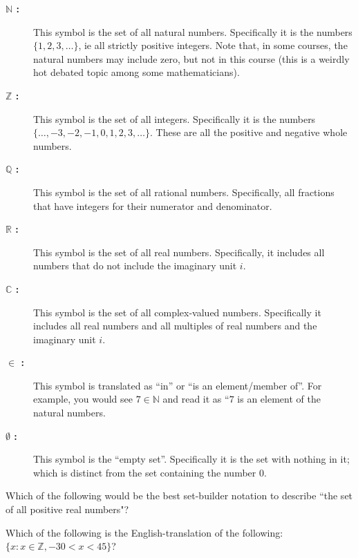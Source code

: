 \documentclass{ximera}
\begin{document}
    \begin{description}
        \item[\textbf{$\mathbb{N}$ :}] This symbol is the set of all natural numbers. Specifically it is the numbers $\{1, 2, 3, \dots \}$, ie all strictly positive integers. Note that, in some courses, the natural numbers may include zero, but not in this course (this is a weirdly hot debated topic among some mathematicians).
        \item[\textbf{$\mathbb{Z}$ :}] This symbol is the set of all integers. Specifically it is the numbers $\{\dots , -3, -2 ,-1, 0, 1, 2, 3, \dots \}$. These are all the positive and negative whole numbers.
        \item[\textbf{$\mathbb{Q}$ :}] This symbol is the set of all rational numbers. Specifically, all fractions that have integers for their numerator and denominator.
        \item[\textbf{$\mathbb{R}$ :}] This symbol is the set of all real numbers. Specifically, it includes all numbers that do not include the imaginary unit $i$.
        \item[\textbf{$\mathbb{C}$ :}] This symbol is the set of all complex-valued numbers. Specifically it includes all real numbers and all multiples of real numbers and the imaginary unit $i$.
        \item[\textbf{$\in$ :}] This symbol is translated as ``in'' or ``is an element/member of''. For example, you would see $7 \in \mathbb{N}$ and read it as ``$7$ is an element of the natural numbers.
        \item[\textbf{$\emptyset$ :}] This symbol is the ``empty set''. Specifically it is the set with nothing in it; which is distinct from the set containing the number $0$.
    \end{description}
    
    \begin{question}
        Which of the following would be the best set-builder notation to describe ``the set of all positive real numbers"?
        \begin{multipleChoice}
        \end{multipleChoice}
    \end{question}
    
    \begin{question}
        Which of the following is the English-translation of the following: $\{x : x\in\mathbb{Z}, -30 < x < 45 \}$?
        \begin{multipleChoice}
        \end{multipleChoice}
    \end{question}
\end{document}
